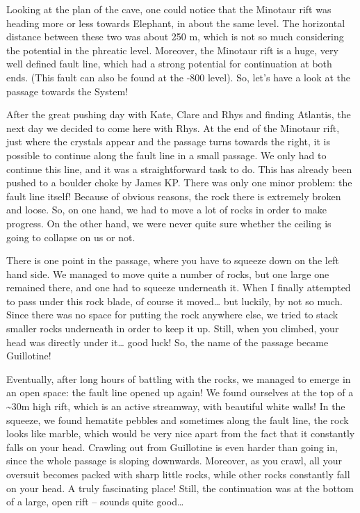 Looking at the plan of the cave, one could notice that the Minotaur rift
was heading more or less towards Elephant, in about the same level. The
horizontal distance between these two was about 250 m, which is not so
much considering the potential in the phreatic level. Moreover, the
Minotaur rift is a huge, very well defined fault line, which had a
strong potential for continuation at both ends. (This fault can also be
found at the -800 level). So, let's have a look at the passage towards
the System!

After the great pushing day with Kate, Clare and Rhys and finding
Atlantis, the next day we decided to come here with Rhys. At the end of
the Minotaur rift, just where the crystals appear and the passage turns
towards the right, it is possible to continue along the fault line in a
small passage. We only had to continue this line, and it was a
straightforward task to do. This has already been pushed to a boulder
choke by James KP. There was only one minor problem: the fault line
itself! Because of obvious reasons, the rock there is extremely broken
and loose. So, on one hand, we had to move a lot of rocks in order to
make progress. On the other hand, we were never quite sure whether the
ceiling is going to collapse on us or not.

There is one point in the passage, where you have to squeeze down on the
left hand side. We managed to move quite a number of rocks, but one
large one remained there, and one had to squeeze underneath it. When I
finally attempted to pass under this rock blade, of course it
moved\ldots{} but luckily, by not so much. Since there was no space for
putting the rock anywhere else, we tried to stack smaller rocks
underneath in order to keep it up. Still, when you climbed, your head
was directly under it\ldots{} good luck! So, the name of the passage
became Guillotine!

Eventually, after long hours of battling with the rocks, we managed to
emerge in an open space: the fault line opened up again! We found
ourselves at the top of a \textasciitilde{}30m high rift, which is an
active streamway, with beautiful white walls! In the squeeze, we found
hematite pebbles and sometimes along the fault line, the rock looks like
marble, which would be very nice apart from the fact that it constantly
falls on your head. Crawling out from Guillotine is even harder than
going in, since the whole passage is sloping downwards. Moreover, as you
crawl, all your oversuit becomes packed with sharp little rocks, while
other rocks constantly fall on your head. A truly fascinating place!
Still, the continuation was at the bottom of a large, open rift --
sounds quite good\ldots{}

